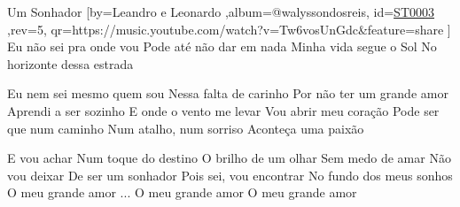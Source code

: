 \beginsong
{Um Sonhador %
}[by={Leandro e Leonardo %
},album={@walyssondosreis},
id={\href{https://music.youtube.com/watch?v=Tw6vosUnGdc&feature=share %
}{ST0003 %
}},rev={5}, %
qr={https://music.youtube.com/watch?v=Tw6vosUnGdc&feature=share %
}]
\beginverse
Eu não sei pra onde vou
Pode até não dar em nada
Minha vida segue o Sol
No horizonte dessa estrada
\endverse

\beginverse 
Eu nem sei mesmo quem sou
Nessa falta de carinho
Por não ter um grande amor
Aprendi a ser sozinho
\endverse
\beginverse 
E onde o vento me levar
Vou abrir meu coração
Pode ser que num caminho
Num atalho, num sorriso
Aconteça uma paixão
\endverse

\beginchorus
E vou achar
Num toque do destino
O brilho de um olhar
Sem medo de amar
Não vou deixar
De ser um sonhador
Pois sei, vou encontrar
No fundo dos meus sonhos
O meu grande amor
\endchorus
{}
\beginverse 
... O meu grande amor
O meu grande amor
\endverse

